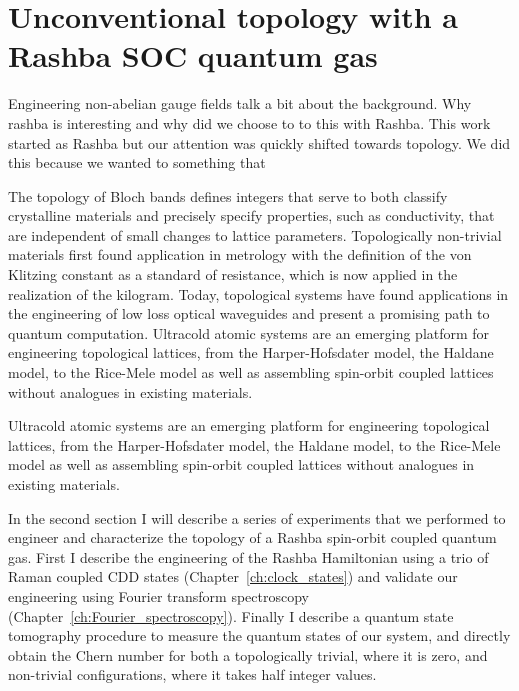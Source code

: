 
\renewcommand{\thechapter}{8}

\chapter{Unconventional topology with a Rashba SOC quantum gas}
\label{ch:Rashba}

Engineering non-abelian gauge fields 
talk a bit about the background. Why rashba is interesting and why did we choose to to this with Rashba. 
This work started as Rashba but our attention was quickly shifted towards topology. We did this because we wanted to something that 

 The topology of Bloch bands defines integers that serve to both classify crystalline materials and precisely specify properties, such as conductivity, that are independent of small changes to lattice parameters\cite{hasan_colloquium:_2010}. Topologically non-trivial materials first found application in metrology with the definition of the von Klitzing constant as a standard of resistance, which is now applied in the realization of the kilogram\cite{newell_codata_2018}. Today, topological systems have found applications in the engineering of low loss optical waveguides\cite{ozawa_topological_2019} and present a promising path to quantum computation\cite{nayak_non-abelian_2008}. Ultracold atomic systems are an emerging platform for engineering topological lattices, from the Harper-Hofsdater model\cite{miyake_realizing_2013,aidelsburger_realization_2013}, the Haldane model\cite{jotzu_experimental_2014}, to the Rice-Mele model\cite{lu_geometrical_2016,lohse_thouless_2016} as well as assembling spin-orbit coupled lattices without analogues in existing materials\cite{wu_realization_2016,sun_highly_2018}.


Ultracold atomic systems are an emerging platform for engineering topological lattices, from the Harper-Hofsdater model\cite{miyake_realizing_2013,aidelsburger_realization_2013}, the Haldane model\cite{jotzu_experimental_2014}, to the Rice-Mele model\cite{lu_geometrical_2016,lohse_thouless_2016} as well as assembling spin-orbit coupled lattices without analogues in existing materials\cite{wu_realization_2016,sun_highly_2018}. 

 In the second section I will describe a series of experiments that we performed to engineer and characterize the topology of a Rashba spin-orbit coupled quantum gas. First I describe the engineering of the Rashba Hamiltonian using a trio of Raman coupled CDD states (Chapter~\ref{ch:clock_states}) and validate our engineering using Fourier transform spectroscopy (Chapter~\ref{ch:Fourier_spectroscopy}). Finally I describe a quantum state tomography procedure to measure the quantum states of our system, and directly obtain the Chern number for both a topologically trivial, where it is zero, and non-trivial configurations, where it takes half integer values. 


